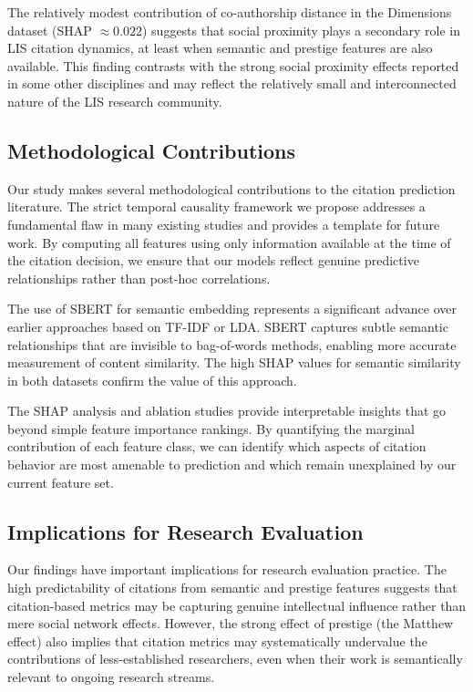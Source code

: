 \documentclass[12pt,a4paper]{article}
\begin{document}
The relatively modest contribution of co-authorship distance in the Dimensions dataset (SHAP $\approx 0.022$) suggests that social proximity plays a secondary role in LIS citation dynamics, at least when semantic and prestige features are also available. This finding contrasts with the strong social proximity effects reported in some other disciplines \citep{newman2004coauthorship, martin2013coauthorship} and may reflect the relatively small and interconnected nature of the LIS research community.

\subsection{Methodological Contributions}

Our study makes several methodological contributions to the citation prediction literature. The strict temporal causality framework we propose addresses a fundamental flaw in many existing studies and provides a template for future work. By computing all features using only information available at the time of the citation decision, we ensure that our models reflect genuine predictive relationships rather than post-hoc correlations.

The use of SBERT for semantic embedding represents a significant advance over earlier approaches based on TF-IDF or LDA. SBERT captures subtle semantic relationships that are invisible to bag-of-words methods, enabling more accurate measurement of content similarity. The high SHAP values for semantic similarity in both datasets confirm the value of this approach.

The SHAP analysis and ablation studies provide interpretable insights that go beyond simple feature importance rankings. By quantifying the marginal contribution of each feature class, we can identify which aspects of citation behavior are most amenable to prediction and which remain unexplained by our current feature set.

\subsection{Implications for Research Evaluation}

Our findings have important implications for research evaluation practice. The high predictability of citations from semantic and prestige features suggests that citation-based metrics may be capturing genuine intellectual influence rather than mere social network effects. However, the strong effect of prestige (the Matthew effect) also implies that citation metrics may systematically undervalue the contributions of less-established researchers, even when their work is semantically relevant to ongoing research streams.
\end{document}
